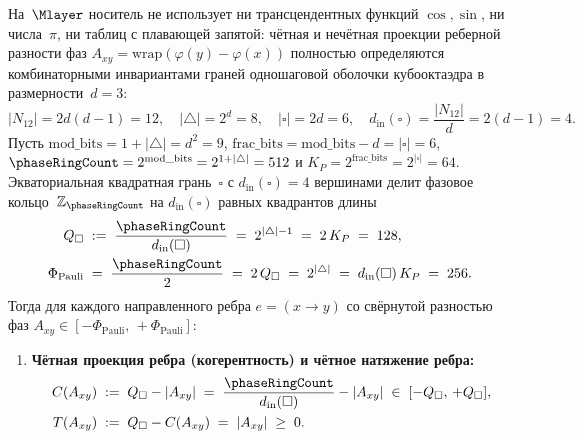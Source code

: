 \begin{theorem}
\label{thm:trig-free-face-projections}
На~$\Mlayer$ носитель не использует ни трансцендентных функций $\cos,\sin$, ни числа~$\pi$, ни таблиц
с плавающей запятой: чётная и нечётная проекции реберной разности фаз $A_{xy} = \mathrm{wrap}(\varphi(y)-\varphi(x))$
полностью определяются комбинаторными инвариантами граней одношаговой оболочки кубооктаэдра в размерности~$d=3$:
\begin{equation}
\label{eq:cubocta-face-invariants}
  |N_{12}| = 2d(d-1) = 12,\quad
  |\triangle| = 2^d = 8,\quad
  |\square| = 2d = 6,\quad
  d_{\mathrm{in}}(\square) = \frac{|N_{12}|}{d} = 2(d-1) = 4.
\end{equation}
Пусть $\mathrm{mod\_bits} = 1 + |\triangle| = d^2 = 9$, $\mathrm{frac\_bits} = \mathrm{mod\_bits} - d = |\square| = 6$,
$\phaseRingCount = 2^{\mathrm{mod\_bits}} = 2^{1+|\triangle|} = 512$ и $K_P = 2^{\mathrm{frac\_bits}} = 2^{|\square|} = 64$.
Экваториальная квадратная грань~$\square$ с $d_{\mathrm{in}}(\square)=4$ вершинами делит фазовое кольцо~$\mathbb{Z}_{\phaseRingCount}$
на $d_{\mathrm{in}}(\square)$ равных квадрантов длины
\begin{equation}
\label{eq:quadrant-pauli-closed}
\begin{aligned}
  Q_\square &\;:=\; \frac{\phaseRingCount}{d_{\mathrm{in}}(\square)} \;=\; 2^{|\triangle|-1} \;=\; 2\,K_P \;=\; 128,\\
  \Phi_{\mathrm{Pauli}} &\;=\; \frac{\phaseRingCount}{2} \;=\; 2\,Q_\square \;=\; 2^{|\triangle|} \;=\; d_{\mathrm{in}}(\square)\,K_P \;=\; 256.
\end{aligned}
\end{equation}
Тогда для каждого направленного ребра $e=(x\to y)$ со свёрнутой разностью фаз $A_{xy}\in[-\Phi_{\mathrm{Pauli}},\,+\Phi_{\mathrm{Pauli}}]$:
\begin{enumerate}[label=(\roman*)]
\item \textbf{Чётная проекция ребра (когерентность) и чётное натяжение ребра:}
  \begin{equation}
  \label{eq:discrete-cos-closed}
  \begin{aligned}
    C(A_{xy}) &\;:=\; Q_\square - |A_{xy}| \;=\; \frac{\phaseRingCount}{d_{\mathrm{in}}(\square)} - |A_{xy}| \;\in\; [-Q_\square,\,+Q_\square],\\
    T(A_{xy}) &\;:=\; Q_\square - C(A_{xy}) \;=\; |A_{xy}| \;\ge\; 0.
  \end{aligned}

\end{equation}
\end{enumerate}
\end{theorem}
